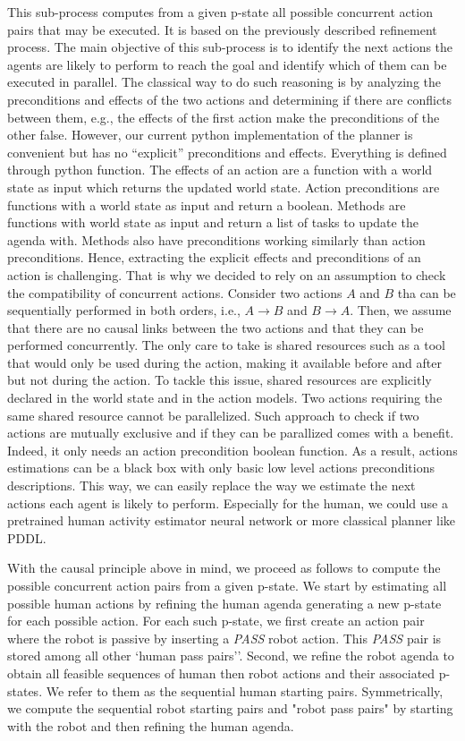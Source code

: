 This sub-process computes from a given p-state all possible concurrent action pairs that may be executed. It is based on the previously described refinement process. The main objective of this sub-process is to identify the next actions the agents are likely to perform to reach the goal and identify which of them can be executed in parallel. The classical way to do such reasoning is by analyzing the preconditions and effects of the two actions and determining if there are conflicts between them, e.g., the effects of the first action make the preconditions of the other false.
However, our current python implementation of the planner is convenient but has no ``explicit'' preconditions and effects. Everything is defined through python function. The effects of an action are a function with a world state as input which returns the updated world state. Action preconditions are functions with a world state as input and return a boolean. Methods are functions with world state as input and return a list of tasks to update the agenda with. Methods also have preconditions working similarly than action preconditions. 
Hence, extracting the explicit effects and preconditions of an action is challenging. That is why we decided to rely on an assumption to check the compatibility of concurrent actions. 
Consider two actions $A$ and $B$ tha can be sequentially performed in both orders, i.e., $A \rightarrow B$ and $B \rightarrow A$. Then, we assume that there are no causal links between the two actions and that they can be performed concurrently. The only care to take is shared resources such as a tool that would only be used during the action, making it available before and after but not during the action. To tackle this issue, shared resources are explicitly declared in the world state and in the action models. Two actions requiring the same shared resource cannot be parallelized.
Such approach to check if two actions are mutually exclusive and if they can be parallized comes with a benefit. Indeed, it only needs an action precondition boolean function. As a result, actions estimations can be a black box with only basic low level actions preconditions descriptions. This way, we can easily replace the way we estimate the next actions each agent is likely to perform. Especially for the human, we could use a pretrained human activity estimator neural network or more classical planner like PDDL. 

With the causal principle above in mind, we proceed as follows to compute the possible concurrent action pairs from a given p-state. We start by estimating all possible human actions by refining the human agenda generating a new p-state for each possible action. For each such p-state, we first create an action pair where the robot is passive by inserting a \textit{PASS} robot action. This \textit{PASS} pair is stored among all other `human pass pairs''. Second, we refine the robot agenda to obtain all feasible sequences of human then robot actions and their associated p-states. We refer to them as the sequential human starting pairs. Symmetrically, we compute the sequential robot starting pairs and "robot pass pairs" by starting with the robot and then refining the human agenda.


